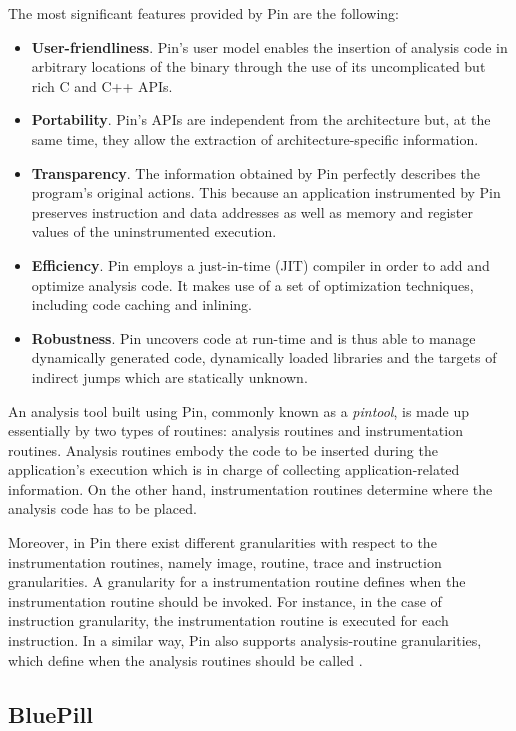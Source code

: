 The most significant features provided by Pin are the following:

\begin{itemize}
\item \textbf{User-friendliness}. Pin's user model enables the insertion of analysis code in arbitrary locations of the binary through the use of its uncomplicated but rich C and C++ APIs.
\item \textbf{Portability}. Pin's APIs are independent from the architecture but, at the same time, they allow the extraction of architecture-specific information.
\item \textbf{Transparency}. The information obtained by Pin perfectly describes the program's original actions. This because an application instrumented by Pin preserves instruction and data addresses as well as memory and register values of the uninstrumented execution. 
\item \textbf{Efficiency}. Pin employs a just-in-time (JIT) compiler in order to add and optimize analysis code. It makes use of a set of optimization techniques, including code caching and inlining.
\item \textbf{Robustness}. Pin uncovers code at run-time and is thus able to manage dynamically generated code, dynamically loaded libraries and the targets of indirect jumps which are statically unknown. 
\end{itemize}

An analysis tool built using Pin, commonly known as a \textit{pintool}, is made up essentially by two types of routines: analysis routines and instrumentation routines. Analysis routines embody the code to be inserted during the application's execution which is in charge of collecting application-related information. On the other hand, instrumentation routines determine where the analysis code has to be placed.  

Moreover, in Pin there exist different granularities with respect to the instrumentation routines, namely image, routine, trace and instruction granularities. A granularity for a instrumentation routine defines when the instrumentation routine should be invoked. For instance, in the case of instruction granularity, the instrumentation routine is executed for each instruction. In a similar way, Pin also supports analysis-routine granularities, which define when the analysis routines should be called \cite{6658603}.

\subsection{BluePill}

